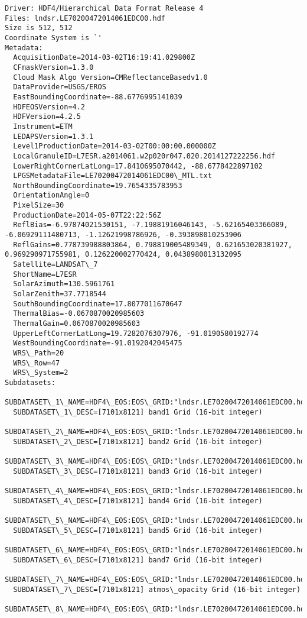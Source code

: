 \documentclass{article}
\begin{document}
    \begin{Verbatim}[commandchars=\\\{\}]
Driver: HDF4/Hierarchical Data Format Release 4
Files: lndsr.LE70200472014061EDC00.hdf
Size is 512, 512
Coordinate System is `'
Metadata:
  AcquisitionDate=2014-03-02T16:19:41.029800Z
  CFmaskVersion=1.3.0
  Cloud Mask Algo Version=CMReflectanceBasedv1.0
  DataProvider=USGS/EROS
  EastBoundingCoordinate=-88.6776995141039
  HDFEOSVersion=4.2
  HDFVersion=4.2.5
  Instrument=ETM
  LEDAPSVersion=1.3.1
  Level1ProductionDate=2014-03-02T00:00:00.000000Z
  LocalGranuleID=L7ESR.a2014061.w2p020r047.020.2014127222256.hdf
  LowerRightCornerLatLong=17.8410695070442, -88.6778422897102
  LPGSMetadataFile=LE70200472014061EDC00\_MTL.txt
  NorthBoundingCoordinate=19.7654335783953
  OrientationAngle=0
  PixelSize=30
  ProductionDate=2014-05-07T22:22:56Z
  ReflBias=-6.97874021530151, -7.19881916046143, -5.62165403366089, -6.06929111480713, -1.12621998786926, -0.393898010253906
  ReflGains=0.778739988803864, 0.798819005489349, 0.621653020381927, 0.969290971755981, 0.126220002770424, 0.0438980013132095
  Satellite=LANDSAT\_7
  ShortName=L7ESR
  SolarAzimuth=130.5961761
  SolarZenith=37.7718544
  SouthBoundingCoordinate=17.8077011670647
  ThermalBias=-0.0670870020985603
  ThermalGain=0.0670870020985603
  UpperLeftCornerLatLong=19.7282076307976, -91.0190580192774
  WestBoundingCoordinate=-91.0192042045475
  WRS\_Path=20
  WRS\_Row=47
  WRS\_System=2
Subdatasets:
  SUBDATASET\_1\_NAME=HDF4\_EOS:EOS\_GRID:"lndsr.LE70200472014061EDC00.hdf":Grid:band1
  SUBDATASET\_1\_DESC=[7101x8121] band1 Grid (16-bit integer)
  SUBDATASET\_2\_NAME=HDF4\_EOS:EOS\_GRID:"lndsr.LE70200472014061EDC00.hdf":Grid:band2
  SUBDATASET\_2\_DESC=[7101x8121] band2 Grid (16-bit integer)
  SUBDATASET\_3\_NAME=HDF4\_EOS:EOS\_GRID:"lndsr.LE70200472014061EDC00.hdf":Grid:band3
  SUBDATASET\_3\_DESC=[7101x8121] band3 Grid (16-bit integer)
  SUBDATASET\_4\_NAME=HDF4\_EOS:EOS\_GRID:"lndsr.LE70200472014061EDC00.hdf":Grid:band4
  SUBDATASET\_4\_DESC=[7101x8121] band4 Grid (16-bit integer)
  SUBDATASET\_5\_NAME=HDF4\_EOS:EOS\_GRID:"lndsr.LE70200472014061EDC00.hdf":Grid:band5
  SUBDATASET\_5\_DESC=[7101x8121] band5 Grid (16-bit integer)
  SUBDATASET\_6\_NAME=HDF4\_EOS:EOS\_GRID:"lndsr.LE70200472014061EDC00.hdf":Grid:band7
  SUBDATASET\_6\_DESC=[7101x8121] band7 Grid (16-bit integer)
  SUBDATASET\_7\_NAME=HDF4\_EOS:EOS\_GRID:"lndsr.LE70200472014061EDC00.hdf":Grid:atmos\_opacity
  SUBDATASET\_7\_DESC=[7101x8121] atmos\_opacity Grid (16-bit integer)
  SUBDATASET\_8\_NAME=HDF4\_EOS:EOS\_GRID:"lndsr.LE70200472014061EDC00.hdf":Grid:fill\_QA

\end{Verbatim}
\end{document}
